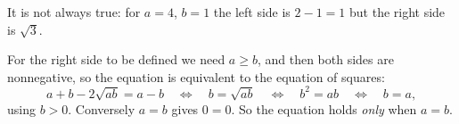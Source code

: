It is not always true: for $a=4$, $b=1$ the left side is $2-1=1$ but the right side is $\sqrt3$.

For the right side to be defined we need $a\ge b$, and then both sides are nonnegative, so the equation is equivalent to the equation of squares:
\[
a+b-2\sqrt{ab}=a-b\quad\Longleftrightarrow\quad b=\sqrt{ab}\quad\Longleftrightarrow\quad b^2=ab\quad\Longleftrightarrow\quad b=a ,
\]
using $b>0$. Conversely $a=b$ gives $0=0$. So the equation holds \emph{only} when $\boxed{a=b}$.
